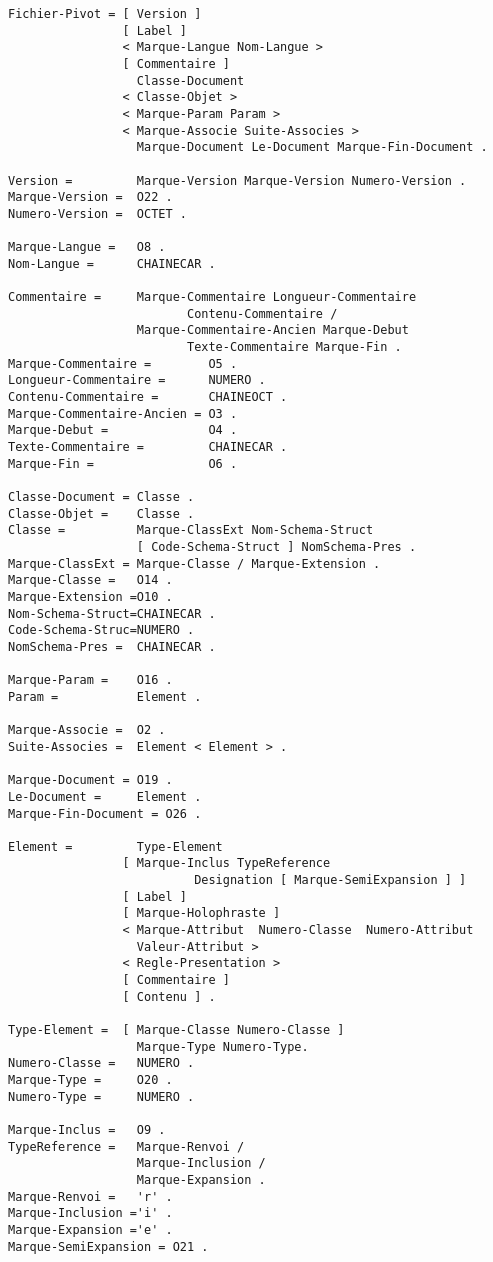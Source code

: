 \begin{verbatim}
Fichier-Pivot = [ Version ]
                [ Label ]
                < Marque-Langue Nom-Langue >
                [ Commentaire ]
                  Classe-Document
                < Classe-Objet >
                < Marque-Param Param >
                < Marque-Associe Suite-Associes >
                  Marque-Document Le-Document Marque-Fin-Document .

Version =         Marque-Version Marque-Version Numero-Version .
Marque-Version =  O22 .
Numero-Version =  OCTET .

Marque-Langue =   O8 .
Nom-Langue =      CHAINECAR .

Commentaire =     Marque-Commentaire Longueur-Commentaire
                         Contenu-Commentaire /
                  Marque-Commentaire-Ancien Marque-Debut
                         Texte-Commentaire Marque-Fin .
Marque-Commentaire =        O5 .
Longueur-Commentaire =      NUMERO .
Contenu-Commentaire =       CHAINEOCT .
Marque-Commentaire-Ancien = O3 .
Marque-Debut =              O4 .
Texte-Commentaire =         CHAINECAR .
Marque-Fin =                O6 .

Classe-Document = Classe .
Classe-Objet =    Classe .
Classe =          Marque-ClassExt Nom-Schema-Struct
                  [ Code-Schema-Struct ] NomSchema-Pres .
Marque-ClassExt = Marque-Classe / Marque-Extension .
Marque-Classe =   O14 .
Marque-Extension =O10 .
Nom-Schema-Struct=CHAINECAR .
Code-Schema-Struc=NUMERO .
NomSchema-Pres =  CHAINECAR .

Marque-Param =    O16 .
Param =           Element .

Marque-Associe =  O2 .
Suite-Associes =  Element < Element > .

Marque-Document = O19 .
Le-Document =     Element .
Marque-Fin-Document = O26 .

Element =         Type-Element
                [ Marque-Inclus TypeReference
                          Designation [ Marque-SemiExpansion ] ]
                [ Label ]
                [ Marque-Holophraste ]
                < Marque-Attribut  Numero-Classe  Numero-Attribut
                  Valeur-Attribut >
                < Regle-Presentation >
                [ Commentaire ]
                [ Contenu ] .

Type-Element =  [ Marque-Classe Numero-Classe ]
                  Marque-Type Numero-Type.
Numero-Classe =   NUMERO .
Marque-Type =     O20 .
Numero-Type =     NUMERO .

Marque-Inclus =   O9 .
TypeReference =   Marque-Renvoi /
                  Marque-Inclusion /
                  Marque-Expansion .
Marque-Renvoi =   'r' .
Marque-Inclusion ='i' .
Marque-Expansion ='e' .
Marque-SemiExpansion = O21 .


\end{verbatim}
